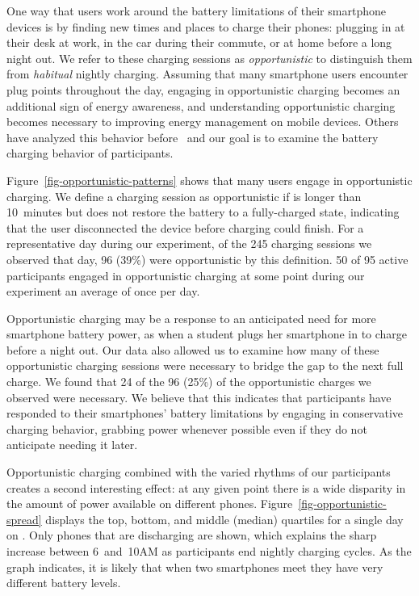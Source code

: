 One way that users work around the battery limitations of their smartphone
devices is by finding new times and places to charge their phones: plugging
in at their desk at work, in the car during their commute, or at home before
a long night out. We refer to these charging sessions as
\textit{opportunistic} to distinguish them from \textit{habitual} nightly
charging. Assuming that many smartphone users encounter plug points
throughout the day, engaging in opportunistic charging becomes an additional
sign of energy awareness, and understanding opportunistic charging becomes
necessary to improving energy management on mobile devices. Others have analyzed
this behavior before~\cite{banerjee:ubicomp:2007, rahmati:mobilehci:2007} and
our goal is to examine the battery charging behavior of \PhoneLab{} participants.

Figure~\ref{fig-opportunistic-patterns} shows that many users engage in
opportunistic charging. We define a charging session as opportunistic if is
longer than 10~minutes but does not restore the battery to a fully-charged
state, indicating that the user disconnected the device before charging could
finish. For a representative day during our experiment, of the 245 charging
sessions we observed that day, 96 (39\%) were opportunistic by this
definition. 50 of 95 active participants engaged in opportunistic charging at
some point during our experiment an average of once per day.

Opportunistic charging may be a response to an anticipated need for more
smartphone battery power, as when a student plugs her smartphone in to charge
before a night out. Our data also allowed us to examine how many of these
opportunistic charging sessions were necessary to bridge the gap to the next
full charge. We found that 24 of the 96 (25\%) of the opportunistic charges
we observed were necessary. We believe that this indicates that participants
have responded to their smartphones' battery limitations by engaging in
conservative charging behavior, grabbing power whenever possible even if they
do not anticipate needing it later.

Opportunistic charging combined with the varied rhythms of our participants
creates a second interesting effect: at any given point there is a wide
disparity in the amount of power available on different phones.
Figure~\ref{fig-opportunistic-spread} displays the top, bottom, and middle
(median) quartiles for a single day on \PhoneLab{}. Only phones that are
discharging are shown, which explains the sharp increase between 6~and~10AM
as participants end nightly charging cycles.  As the graph indicates, it is
likely that when two smartphones meet they have very different battery
levels.


